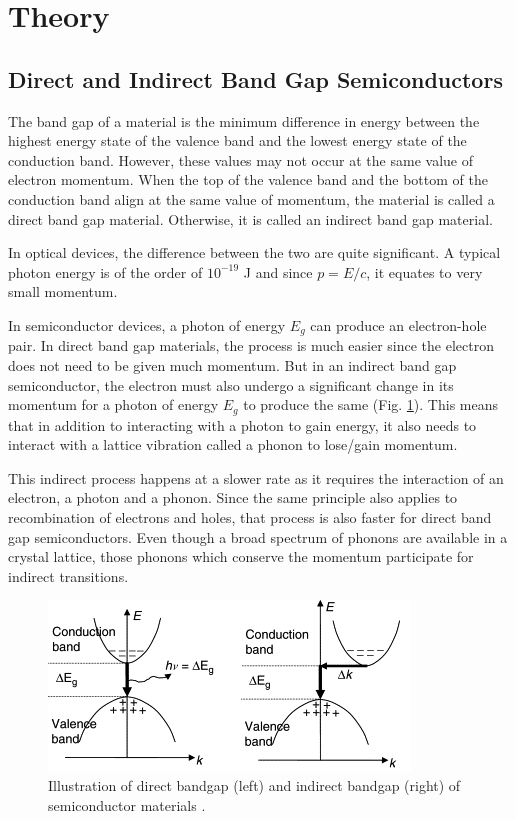 \section{Theory}

\subsection{Direct and Indirect Band Gap Semiconductors}

The band gap of a material is the minimum difference in energy between the highest energy state of the valence band and the lowest energy state of the conduction band. However, these values may not occur at the same value of electron momentum. When the top of the valence band and the bottom of the conduction band align at the same value of momentum, the material is called a direct band gap material. Otherwise, it is called an indirect band gap material.

In optical devices, the difference between the two are quite significant. A typical photon energy is of the order of $10^{-19}$ J and since $p=E/c$, it equates to very small momentum. 

In semiconductor devices, a photon of energy $E_g$ can produce an electron-hole pair. In direct band gap materials, the process is much easier since the electron does not need to be given much momentum. But in an indirect band gap semiconductor, the electron must also undergo a significant change in its momentum for a photon of energy $E_g$ to produce the same (Fig. \ref{bg}). This means that in addition to interacting with a photon to gain energy, it also needs to interact with a lattice vibration called a phonon to lose/gain momentum.

This indirect process happens at a slower rate as it requires the interaction of an electron, a photon and a phonon. Since the same principle also applies to recombination of electrons and holes, that process is also faster for direct band gap semiconductors. Even though a broad spectrum of phonons are available in a crystal lattice, those phonons which conserve
the momentum participate for indirect transitions.

\begin{figure}
    \centering
    \includegraphics[width=1\columnwidth]{images/bg.png}
    \caption{Illustration of direct bandgap (left) and indirect bandgap (right) of semiconductor materials \cite{HUI20091}.}
    \label{bg}
\end{figure}

